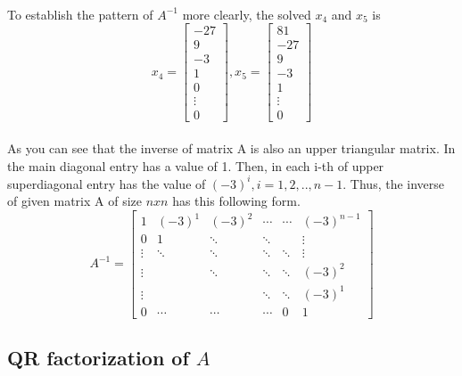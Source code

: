 \documentclass[a4paper]{article}
\begin{document}
\paragraph{}
To establish the pattern of $A^{-1}$ more clearly, the solved $x_4$ and $x_5$ is
\begin{equation*}
x_4 = \begin{bmatrix} -27 \\ 9 \\ -3 \\ 1 \\ 0 \\ \vdots\\ 0  \end{bmatrix},
x_5 = \begin{bmatrix} 81 \\ -27 \\ 9 \\ -3 \\ 1 \\ \vdots\\ 0  \end{bmatrix}
\end{equation*}
\paragraph{}
As you can see that the inverse of matrix A is also an upper triangular matrix. In the main diagonal entry has a value of 1. Then, in each i-th of upper superdiagonal entry has the value of $(-3)^i ,i = 1,2,..,n-1$. Thus, the inverse of given matrix A of size $nxn$ has this following form.
\begin{equation*}
A^{-1}=
\begin{bmatrix}
   1      & (-3)^1 & (-3)^2 & \cdots & \cdots & (-3)^{n-1}  \\
   0      & 1      & \ddots & \ddots &        & \vdots      \\
   \vdots & \ddots & \ddots & \ddots & \ddots & \vdots      \\
   \vdots &        & \ddots & \ddots & \ddots & (-3)^{2}    \\
   \vdots &        &        & \ddots & \ddots & (-3)^{1}    \\
   0      & \cdots & \cdots & \cdots & 0 & 1
\end{bmatrix}
\end{equation*}

\subsection*{QR factorization of $A$}
\end{document}
